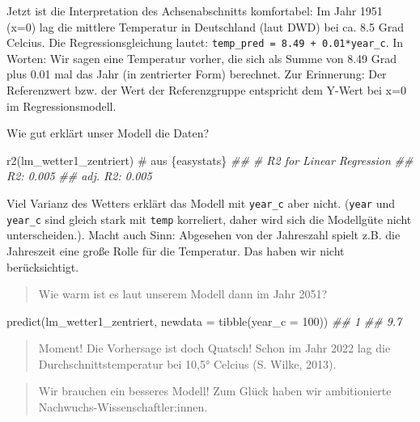 \documentclass[
  letterpaper,
  oneside,
  open=any]{scrbook}
\newenvironment{Shaded}{\begin{snugshade}}{\end{snugshade}}
\newcommand{\AttributeTok}[1]{\textcolor[rgb]{0.40,0.45,0.13}{#1}}
\newcommand{\CommentTok}[1]{\textcolor[rgb]{0.37,0.37,0.37}{#1}}
\newcommand{\DecValTok}[1]{\textcolor[rgb]{0.68,0.00,0.00}{#1}}
\newcommand{\DocumentationTok}[1]{\textcolor[rgb]{0.37,0.37,0.37}{\textit{#1}}}
\newcommand{\FunctionTok}[1]{\textcolor[rgb]{0.28,0.35,0.67}{#1}}
\newcommand{\NormalTok}[1]{\textcolor[rgb]{0.00,0.23,0.31}{#1}}
\theoremstyle{definition}
\theoremstyle{definition}
\theoremstyle{definition}
\theoremstyle{remark}
\begin{document}
Jetzt ist die Interpretation des Achsenabschnitts komfortabel: Im Jahr
1951 (x=0) lag die mittlere Temperatur in Deutschland (laut DWD) bei ca.
8.5 Grad Celcius. Die Regressionsgleichung lautet:
\texttt{temp\_pred\ =\ 8.49\ +\ 0.01*year\_c}. In Worten: Wir sagen eine
Temperatur vorher, die sich als Summe von 8.49 Grad plus 0.01 mal das
Jahr (in zentrierter Form) berechnet. Zur Erinnerung: Der Referenzwert
bzw. der Wert der Referenzgruppe entspricht dem Y-Wert bei x=0 im
Regressionsmodell.

Wie gut erklärt unser Modell die Daten?

\begin{Shaded}
\begin{Highlighting}[]
\FunctionTok{r2}\NormalTok{(lm\_wetter1\_zentriert)  }\CommentTok{\# aus \textasciigrave{}\{easystats\}\textasciigrave{}}
\DocumentationTok{\#\# \# R2 for Linear Regression}
\DocumentationTok{\#\#        R2: 0.005}
\DocumentationTok{\#\#   adj. R2: 0.005}
\end{Highlighting}
\end{Shaded}

Viel Varianz des Wetters erklärt das Modell mit \texttt{year\_c} aber
nicht. (\texttt{year} und \texttt{year\_c} sind gleich stark mit
\texttt{temp} korreliert, daher wird sich die Modellgüte nicht
unterscheiden.). Macht auch Sinn: Abgesehen von der Jahreszahl spielt
z.B. die Jahreszeit eine große Rolle für die Temperatur. Das haben wir
nicht berücksichtigt.

\begin{quote}
{} Wie warm ist es laut unserem Modell dann im Jahr 2051?
\end{quote}

\begin{Shaded}
\begin{Highlighting}[]
\FunctionTok{predict}\NormalTok{(lm\_wetter1\_zentriert, }\AttributeTok{newdata =} \FunctionTok{tibble}\NormalTok{(}\AttributeTok{year\_c =} \DecValTok{100}\NormalTok{))}
\DocumentationTok{\#\#   1 }
\DocumentationTok{\#\# 9.7}
\end{Highlighting}
\end{Shaded}

\begin{quote}
{} Moment! Die Vorhersage ist doch Quatsch! Schon im Jahr
2022 lag die Durchschnittstemperatur bei 10,5° Celcius (S. Wilke, 2013).
\end{quote}

\begin{quote}
{} Wir brauchen ein besseres Modell! Zum Glück haben wir
ambitionierte Nachwuchs-Wissenschaftler:innen.
\end{quote}
\end{document}
